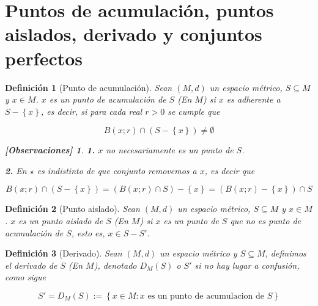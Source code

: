 \documentclass[oneside]{book} %
\theoremstyle{Teorema}
\newtheorem{Definicion}{Definición}[chapter]
\theoremstyle{Ejemplos}
\theoremstyle{[Obs]}
\newtheorem*{Obs}{[Observaciones]}
\renewcommand{\{}{\left\lbrace} %
\renewcommand{\}}{\right\rbrace} %
\newcommand{\n}{\cap} %
\renewcommand{\sc}{\subseteq} %
\begin{document}
		\section{Puntos de acumulación, puntos aislados, derivado y conjuntos perfectos}

			\begin{Definicion}[Punto de acumulación]\setlength{\parindent}{0em}
					
				Sean $(M, d)$ un espacio métrico, $S \sc M$ y $x \in M$. $x$ es un punto de acumulación de $S$ (En $M$) si $x$ es adherente a $S - \{ x \}$, es decir, si para cada real $r > 0$ se cumple que
				
				\begin{equation*}\tag{$\star$}
					B(x;r) \n (S - \{ x \}) \neq \emptyset 
				\end{equation*}

				\begin{Obs}
				
					\textbf{1.} $x$ no necesariamente es un punto de $S$.

					\textbf{2.} En $\star$ es indistinto de que conjunto removemos a $x$, es decir que 
					
					\[ B(x;r) \n (S - \{ x \}) = (B(x;r) \n S) - \{ x \} = (B(x;r) - \{ x \}) \n S \]
				
				\end{Obs}

			\end{Definicion}
			
			\begin{Definicion}[Punto aislado]\setlength{\parindent}{0em}
			
				Sean $(M, d)$ un espacio métrico, $S \sc M$ y $x \in M$. $x$ es un punto aislado de $S$ (En $M$) si $x$ es un punto de $S$ que no es punto de acumulación de $S$, esto es, $x \in S - S'$.
			
			\end{Definicion}

			\begin{Definicion}[Derivado]\setlength{\parindent}{0em}
					
				Sean $(M, d)$ un espacio métrico y $S \sc M$, definimos el derivado de $S$ (En $M$), denotado $D_{M}(S)$ o $S'$ si no hay lugar a confusión, como sigue 

				\[ S' = D_{M}(S) := \{ x \in M : x \text{ es un punto de acumulacion de } S \} \] 

			\end{Definicion}
			
\end{document}
